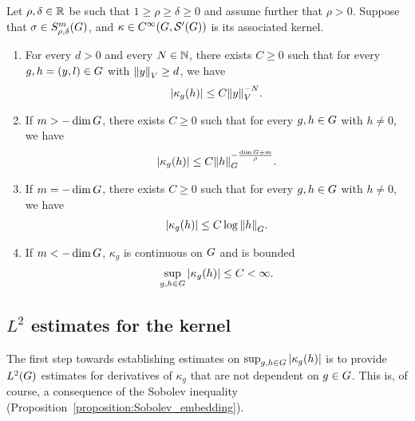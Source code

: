 \begin{theorem}
\label{theorem:kernel_estimates}
    Let $\rho, \delta \in \R$ be such that $1 \geq \rho \geq \delta \geq 0$
    and assume further that $\rho > 0$.
    Suppose that $\sigma \in \SymbolClass{m}{\rho, \delta}$,
    and $\kappa \in \SmoothFunctions {\Group, \TemperedDistributions \Group}$ is its associated kernel.
    \begin{enumerate}
        \item \label{item:kernel_estimates:at_infinity}
            For every $d > 0$ and every $N \in \N$,
            there exists $C \geq 0$ such that for every $g, h = (y, l) \in \Group$ with $\norm {y} \geq d$, we have
            \begin{align*}
                \abs{\kappa_g(h)} \leq C \norm y^{-N}.
            \end{align*}
        \item \label{item:kernel_estimates:at_origin:positive}
            If $m > - \dim \Group$, there exists $C \geq 0$ such that for every $g, h \in \Group$ with $h \neq 0$, we have
            \begin{align*}
                \abs{\kappa_g(h)} \leq C \norm [\Group] h^{- \frac{\dim \Group + m}{\rho}}.
            \end{align*}
        \item \label{item:kernel_estimates:at_origin:zero}
            If $m = -\dim \Group$, there exists $C \geq 0$ such that for every $g, h \in \Group$ with $h \neq 0$, we have
            \begin{align*}
                \abs{\kappa_g(h)} \leq C \log \norm [\Group] h.
            \end{align*}
        \item \label{item:kernel_estimates:at_origin:negative}
            If $m < -\dim \Group$, $\kappa_g$ is continuous on $\Group$ and is bounded
            \begin{align*}
                \sup_{g, h \in \Group} \abs{\kappa_g(h)} \leq C < \infty.
            \end{align*}
    \end{enumerate}
\end{theorem}

\subsection{\texorpdfstring{$L^2$}{L2} estimates for the kernel}

The first step towards establishing estimates on $\sup_{g, h \in \Group} \abs {\kappa_g(h)}$
is to provide $\Lebesgue 2 \Group$ estimates for derivatives of $\kappa_g$ that are not dependent on $g \in \Group$.
This is, of course, a consequence of the Sobolev inequality (Proposition~\ref{proposition:Sobolev_embedding}).

